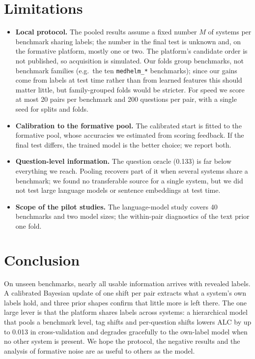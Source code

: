 \documentclass{article}
\newcommand{\code}[1]{\texttt{#1}}
\begin{document}
\section{Limitations}
\label{sec:limitations}

\begin{itemize}
  \item \textbf{Local protocol.} The pooled results assume a fixed number $M$ of systems per benchmark sharing labels; the number in the final test is unknown and, on the formative platform, mostly one or two. The platform's candidate order is not published, so acquisition is simulated. Our folds group benchmarks, not benchmark families (e.g.\ the ten \code{medhelm\_*} benchmarks); since our gains come from labels at test time rather than from learned features this should matter little, but family-grouped folds would be stricter. For speed we score at most 20 pairs per benchmark and 200 questions per pair, with a single seed for splits and folds.
  \item \textbf{Calibration to the formative pool.} The calibrated start is fitted to the formative pool, whose accuracies we estimated from scoring feedback. If the final test differs, the trained model is the better choice; we report both.
  \item \textbf{Question-level information.} The question oracle (0.133) is far below everything we reach. Pooling recovers part of it when several systems share a benchmark; we found no transferable source for a single system, but we did not test large language models or sentence embeddings at test time.
  \item \textbf{Scope of the pilot studies.} The language-model study covers 40 benchmarks and two model sizes; the within-pair diagnostics of the text prior one fold.
\end{itemize}

\section{Conclusion}
\label{sec:conclusion}

On unseen benchmarks, nearly all usable information arrives with revealed labels. A calibrated Bayesian update of one shift per pair extracts what a system's own labels hold, and three prior shapes confirm that little more is left there. The one large lever is that the platform shares labels across systems: a hierarchical model that pools a benchmark level, tag shifts and per-question shifts lowers ALC by up to 0.013 in cross-validation and degrades gracefully to the own-label model when no other system is present. We hope the protocol, the negative results and the analysis of formative noise are as useful to others as the model.
\end{document}
